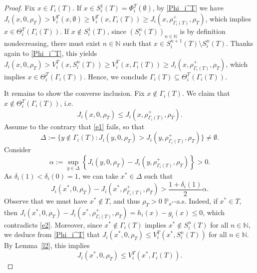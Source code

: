 \documentclass[11pt,reqno]{article}
\numberwithin{equation}{section}
\newcommand{\lemref}{Lemma~\ref}
\renewcommand{\P}{\mathbb{P}}
\newcommand{\cE}{\mathcal{E}}
\newcommand{\N}{\mathbb{N}}
\begin{document}
\begin{proof}
Fix $x\in \Gamma_i(T)$. If $x\in S_i^1(T)= \Phi_i^T(\emptyset)$, by \eqref{Phi_i^T} we have $J_i(x,0,\rho_T)>V_i^T(x,\emptyset)\geq V_i^T(x,\Gamma_i(T))\geq J_i(x,\rho^+_{\Gamma_i(T)},\rho_T)$, which implies $x\in\Theta_i^T(\Gamma_i(T))$. If $x\notin S_i^1(T)$, since $(S_i^n(T))_{n\in\N}$ is by definition nondecreasing, there must exist $n\in\N$ such that $x\in S_i^{n+1}(T)\setminus S_i^n(T)$. Thanks again to \eqref{Phi_i^T}, this yields $J_i(x,0,\rho_T)>V_i^T(x,S_i^n(T))\geq V_i^T(x,\Gamma_i(T))\geq J_i(x,\rho^+_{\Gamma_i(T)},\rho_T)$, which implies $x\in\Theta_i^T(\Gamma_i(T))$. Hence, we conclude $\Gamma_i(T)\subseteq\Theta_i^T(\Gamma_i(T))$. 

It remains to show the converse inclusion. Fix $x\notin \Gamma_i(T)$. We claim that $x\notin \Theta_i^T(\Gamma_i(T))$, i.e. 
\begin{equation}\label{e1}
J_i(x,0,\rho_T)\leq J_i(x,\rho^+_{\Gamma_i(T)},\rho_T).
\end{equation}
Assume to the contrary that \eqref{e1} fails, so that 
\begin{equation}\label{Delta}
\Delta:=\{y\notin \Gamma_i(T): J_i(y,0,\rho_T)>J_i(y,\rho^+_{\Gamma_i(T)},\rho_T)\} \neq\emptyset. %
\end{equation}
Consider
\begin{equation}\label{alpha}
\alpha:=\sup_{y\in\Delta}\left\{J_i(y,0,\rho_T)-J_i(y,\rho^+_{\Gamma_i(T)},\rho_T)\right\}>0.
\end{equation}
As $\delta_i(1)<\delta_i(0)=1$, we can take $x^*\in\Delta$ such that
\begin{equation}\label{e2}
J_i(x^*,0,\rho_T)-J_i(x^*,\rho^+_{\Gamma_i(T)},\rho_T)>\frac{1+\delta_i(1)}{2}\alpha.
\end{equation}
Observe that we must have $x^*\notin T$, and thus $\rho_T>0$ $\P_{x^*}$-a.s. Indeed, if $x^*\in T$, then $J_i(x^*,0,\rho_T)-J_i(x^*,\rho^+_{\Gamma_i(T)},\rho_T)=h_i(x)-g_i(x)\leq 0$, which contradicts \eqref{e2}. Moreover, since $x^*\notin \Gamma_i(T)$ implies $x^*\notin S_i^{n}(T)$ for all $n\in\N$, we deduce from \eqref{Phi_i^T} that $J_i(x^*,0,\rho_T)\leq V_i^T(x^*,S_i^n(T))$ for all $n\in\N$. By \lemref{l2}, this implies 
\begin{equation}\label{J<V^T}
J_i(x^*,0,\rho_T)\leq V_i^T(x^*,\Gamma_i(T)).

\end{equation}
\end{proof}
\end{document}
